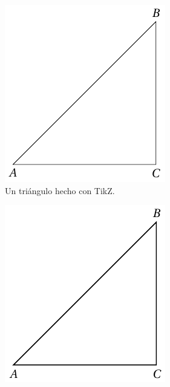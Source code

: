 \documentclass[%
extracommands,%
]{revistaanem}
\begin{document}
\begin{figure}[h]
  \centering
  \begin{subfigure}[b]{0.31\textwidth}
    \includegraphics[width=\textwidth]{triangulo-precompilado} %
    \caption{Un triángulo hecho con TikZ.}\label{fig:triangulo-tikz}
  \end{subfigure}
  \hspace{0.1\textwidth}
  \begin{subfigure}[b]{0.31\textwidth}
    \includegraphics[width=\textwidth]{triangulo-ps-precompilado} %

\end{subfigure}
\end{figure}
\end{document}
